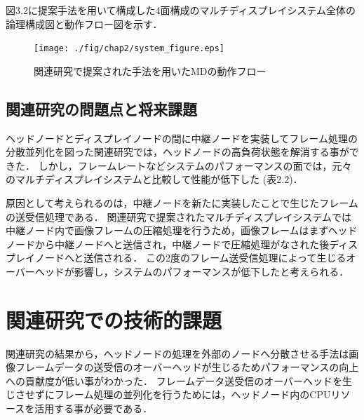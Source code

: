 図3.2に提案手法を用いて構成した4面構成のマルチディスプレイシステム全体の論理構成図と動作フロー図を示す．


\begin{figure}[H]
  \hspace*{\fill}
  \texttt{[image: ./fig/chap2/system\_figure.eps]}
  \hspace*{\fill}
  \caption{関連研究で提案された手法を用いたMDの動作フロー}
 \end{figure}

 \subsection*{関連研究の問題点と将来課題}
 ヘッドノードとディスプレイノードの間に中継ノードを実装してフレーム処理の分散並列化を図った関連研究では，ヘッドノードの高負荷状態を解消する事ができた．
 しかし，フレームレートなどシステムのパフォーマンスの面では，元々のマルチディスプレイシステムと比較して性能が低下した (表2.2)．

 \begin{table}
  \centering
  \caption{中継ノード実装によるフレームレートの比較}\label{tab1}
  \end{table}

 原因として考えられるのは，中継ノードを新たに実装したことで生じたフレームの送受信処理である．
 関連研究で提案されたマルチディスプレイシステムでは中継ノード内で画像フレームの圧縮処理を行うため，画像フレームはまずヘッドノードから中継ノードへと送信され，中継ノードで圧縮処理がなされた後ディスプレイノードへと送信される．
 この2度のフレーム送受信処理によって生じるオーバーヘッドが影響し，システムのパフォーマンスが低下したと考えられる．

 \section{関連研究での技術的課題}
関連研究の結果から，ヘッドノードの処理を外部のノードへ分散させる手法は画像フレームデータの送受信のオーバーヘッドが生じるためパフォーマンスの向上への貢献度が低い事がわかった．
フレームデータ送受信のオーバーヘッドを生じさせずにフレーム処理の並列化を行うためには，ヘッドノード内のCPUリソースを活用する事が必要である．

